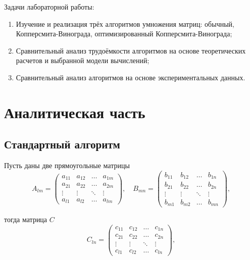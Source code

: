 \documentclass[12pt]{report}
\begin{document}
Задачи лабораторной работы:

\begin{enumerate}
	\item Изучение и реализация трёх алгоритмов умножения матриц: обычный, Копперсмита-Винограда, оптимизированный Копперсмита-Винограда;
	\item Сравнительный анализ трудоёмкости алгоритмов на основе теоретических расчетов и выбранной модели вычислений;
	\item Сравнительный анализ алгоритмов на основе экспериментальных данных.
\end{enumerate}

\chapter{Аналитическая часть}


\section{Стандартный алгоритм}

Пусть даны две прямоугольные матрицы
\begin{equation}
	A_{lm} = \begin{pmatrix}
		a_{11} & a_{12} & \ldots & a_{1m}\\
		a_{21} & a_{22} & \ldots & a_{2m}\\
		\vdots & \vdots & \ddots & \vdots\\
		a_{l1} & a_{l2} & \ldots & a_{lm}
	\end{pmatrix},
	\quad
		B_{mn} = \begin{pmatrix}
		b_{11} & b_{12} & \ldots & b_{1n}\\
		b_{21} & b_{22} & \ldots & b_{2n}\\
		\vdots & \vdots & \ddots & \vdots\\
		b_{m1} & b_{m2} & \ldots & b_{mn}
	\end{pmatrix},
\end{equation}

тогда матрица $C$
\begin{equation}
	C_{ln} = \begin{pmatrix}
		c_{11} & c_{12} & \ldots & c_{1n}\\
		c_{21} & c_{22} & \ldots & c_{2n}\\
		\vdots & \vdots & \ddots & \vdots\\
		c_{l1} & c_{l2} & \ldots & c_{ln}
	\end{pmatrix},
\end{equation}
\end{document}
